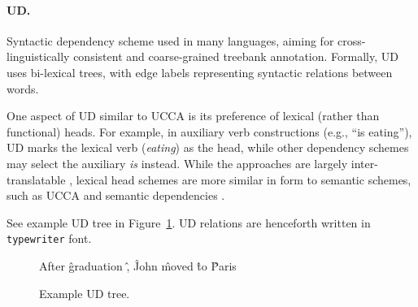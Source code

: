 \documentclass[11pt,a4paper]{article}
\begin{document}
\paragraph{UD.}\label{sec:ud}
Syntactic dependency scheme used in many languages,
aiming for cross-linguistically consistent and coarse-grained treebank
annotation. Formally, UD uses bi-lexical trees, with edge labels 
representing syntactic relations between words.

  One aspect of UD similar to UCCA is its preference of lexical (rather than functional) heads.
  For example, in auxiliary verb constructions (e.g., ``is eating''), UD
  marks the lexical verb (\textit{eating}) as the head, while other dependency schemes
  may select the auxiliary \textit{is} instead.
  While the approaches are largely inter-translatable
  \citep{Schwartz:12}, lexical head schemes are more similar in form to semantic schemes,
   such as UCCA and semantic dependencies \citep{oepen2016towards}.
   
See example UD tree in Figure~\ref{fig:original_example_ud}.
UD relations are henceforth written in \texttt{typewriter} font.

\begin{figure}[th]
  \centering
    \begin{dependency}[text only label, label style={above,font=\tt}, font=\small]
    \begin{deptext}[column sep=.8em,ampersand replacement=\^]
    After \^ graduation \^ , \^ John \^ moved \^ to \^ Paris \\
    \end{deptext}
    \end{dependency}
\caption{Example UD tree.\label{fig:original_example_ud}}
\end{figure}


\end{document}
